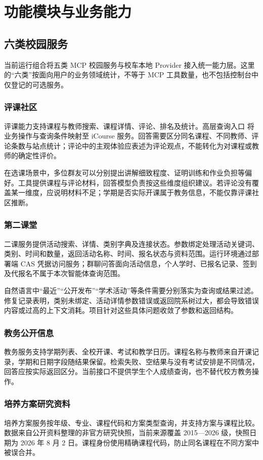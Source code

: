 \section{功能模块与业务能力}
\subsection{六类校园服务}
当前运行组合将五类 MCP 校园服务与校车本地 Provider 接入统一能力层。这里的“六类”按面向用户的业务领域统计，不等于 MCP 工具数量，也不包括控制台中仅登记的可选服务。

\subsubsection{评课社区}
评课能力支持课程与教师搜索、课程详情、评论、排名及统计。高层查询入口  将业务操作与查询条件映射至 iCourse 服务。回答需要区分同名课程、不同教师、评论条数与站点统计；评论中的主观体验应表述为评论观点，不能转化为对课程或教师的确定性评价。

在选课场景中，多位群友可以分别提出讲解细致程度、证明训练和作业负担等偏好。工具提供课程与评论材料，回答模型负责按这些维度组织建议。若评论没有覆盖某一维度，应说明材料不足；学期是否实际开课属于教务信息，不能仅靠评课社区推断。

\subsubsection{第二课堂}
二课服务提供活动搜索、详情、类别字典及连接状态。参数绑定处理活动关键词、类别、时间和数量，返回活动名称、时间、报名状态与资料范围。运行环境通过部署端 CAS 凭据访问服务；群聊问答面向活动信息，个人学时、已报名记录、签到及代报名不属于本次智能体查询范围。

自然语言中“最近”“公开发布”“学术活动”等条件需要分别落实为查询或结果过滤。修复记录表明，类别未绑定、活动详情参数错误或返回院系树过大，都会导致错误内容或过高的上下文消耗。项目针对这些具体问题收敛了参数和返回结构。

\subsubsection{教务公开信息}
教务服务支持学期列表、全校开课、考试和教学日历。课程名称与教师来自开课记录，学期和日期字段随结果保留。检索失败、空结果与没有考试安排是不同情况，回答应按实际返回区分。当前接口不提供学生个人成绩查询，也不替代校方教务操作。

\subsubsection{培养方案研究资料}
培养方案服务按年级、专业、课程代码和方案类型查询，并支持方案与课程比较。数据来自公开资料整理的非官方研究快照，当前来源覆盖 2015—2026 级，快照日期为 2026 年 8 月 2 日。课程身份使用精确课程代码，防止同名课程在不同方案中被误合并。

